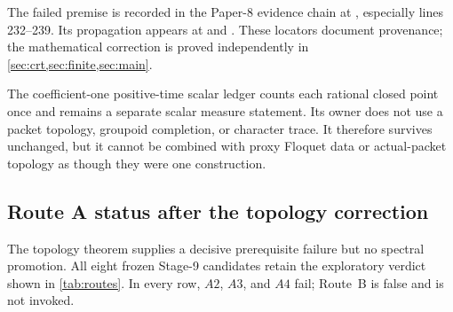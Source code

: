 \documentclass[11pt]{article}
\theoremstyle{definition}
\begin{document}
The failed premise is recorded in the Paper-8 evidence chain at
, especially lines 232--239.
Its propagation appears at
 and
.
These locators document provenance; the mathematical correction is proved independently in \cref{sec:crt,sec:finite,sec:main}.

The coefficient-one positive-time scalar ledger counts each rational closed point once and remains a separate scalar measure statement.  Its owner does not use a packet topology, groupoid completion, or character trace.  It therefore survives unchanged, but it cannot be combined with proxy Floquet data or actual-packet topology as though they were one construction.

\subsection{Route A status after the topology correction}

The topology theorem supplies a decisive prerequisite failure but no spectral promotion.  All eight frozen Stage-9 candidates retain the exploratory verdict shown in \cref{tab:routes}.  In every row, \(A2\), \(A3\), and \(A4\) fail; Route~B is false and is not invoked.
\end{document}
